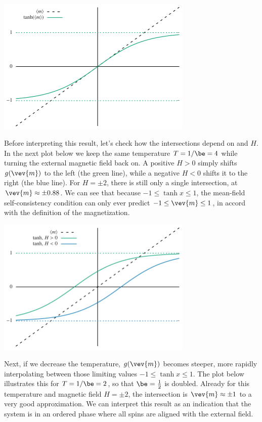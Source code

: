 \begin{center}\includegraphics[width=0.7\textwidth]{figs/unit09_consistency.pdf}\end{center}

Before interpreting this result, let's check how the intersections depend on \be and $H$.
In the next plot below we keep the same temperature $T = 1 / \be = 4$ while turning the external magnetic field back on.
A positive $H > 0$ simply shifts $g(\vev{m})$ to the left (the green line), while a negative $H < 0$ shifts it to the right (the blue line).
For $H = \pm 2$, there is still only a single intersection, at $\vev{m} \approx \pm 0.88$.
We can see that because $-1 \leq \tanh x \leq 1$, the mean-field self-consistency condition can only ever predict $-1 \leq \vev{m} \leq 1$, in accord with the definition of the magnetization.

\begin{center}\includegraphics[width=0.7\textwidth]{figs/unit09_consistency_H.pdf}\end{center}

Next, if we decrease the temperature, $g(\vev{m})$ becomes steeper, more rapidly interpolating between those limiting values $-1 \leq \tanh x \leq 1$.
The plot below illustrates this for $T = 1 / \be = 2$, so that $\be = \frac{1}{2}$ is doubled.
Already for this temperature and magnetic field $H = \pm 2$, the intersection is $\vev{m} \approx \pm 1$ to a very good approximation.
We can interpret this result as an indication that the system is in an ordered phase where all spins are aligned with the external field.

